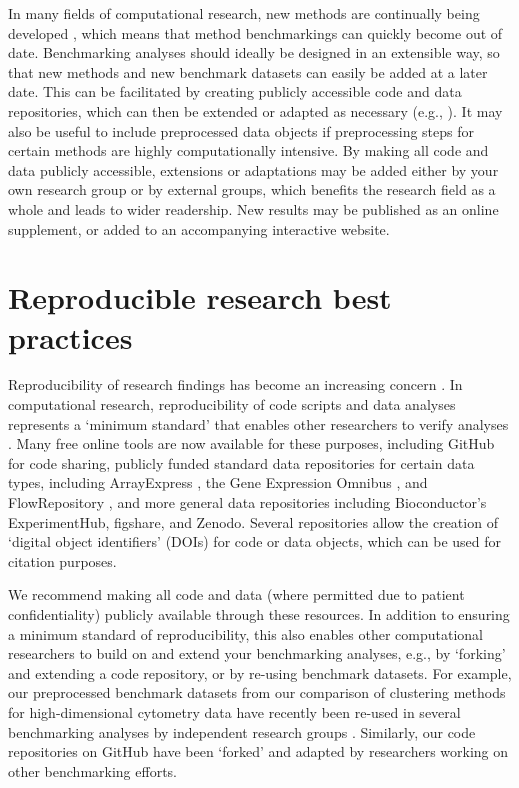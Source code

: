\documentclass[12pt, a4paper]{article}
\begin{document}
In many fields of computational research, new methods are continually being developed \citep{Zappia2018}, which means that method benchmarkings can quickly become out of date. Benchmarking analyses should ideally be designed in an extensible way, so that new methods and new benchmark datasets can easily be added at a later date. This can be facilitated by creating publicly accessible code and data repositories, which can then be extended or adapted as necessary (e.g., \citep{Saelens2018a, Saelens2018b, Duo2018, Soneson2018, Weber2016}). It may also be useful to include preprocessed data objects if preprocessing steps for certain methods are highly computationally intensive. By making all code and data publicly accessible, extensions or adaptations may be added either by your own research group or by external groups, which benefits the research field as a whole and leads to wider readership. New results may be published as an online supplement, or added to an accompanying interactive website.




\section*{Reproducible research best practices}

Reproducibility of research findings has become an increasing concern \citep{Ioannidis2005}. In computational research, reproducibility of code scripts and data analyses represents a `minimum standard' that enables other researchers to verify analyses \citep{Peng2011}. Many free online tools are now available for these purposes, including GitHub for code sharing, publicly funded standard data repositories for certain data types, including ArrayExpress \citep{Kolesnikov2015}, the Gene Expression Omnibus \citep{Barrett2013}, and FlowRepository \citep{Spidlen2012}, and more general data repositories including Bioconductor's ExperimentHub, figshare, and Zenodo. Several repositories allow the creation of `digital object identifiers' (DOIs) for code or data objects, which can be used for citation purposes.

We recommend making all code and data (where permitted due to patient confidentiality) publicly available through these resources. In addition to ensuring a minimum standard of reproducibility, this also enables other computational researchers to build on and extend your benchmarking analyses, e.g., by `forking' and extending a code repository, or by re-using benchmark datasets. For example, our preprocessed benchmark datasets from our comparison of clustering methods for high-dimensional cytometry data \citep{Weber2016} have recently been re-used in several benchmarking analyses by independent research groups \citep{Konstorum2018, Abdelaal2018, Hu2018}. Similarly, our code repositories on GitHub have been `forked' and adapted by researchers working on other benchmarking efforts.
\end{document}
